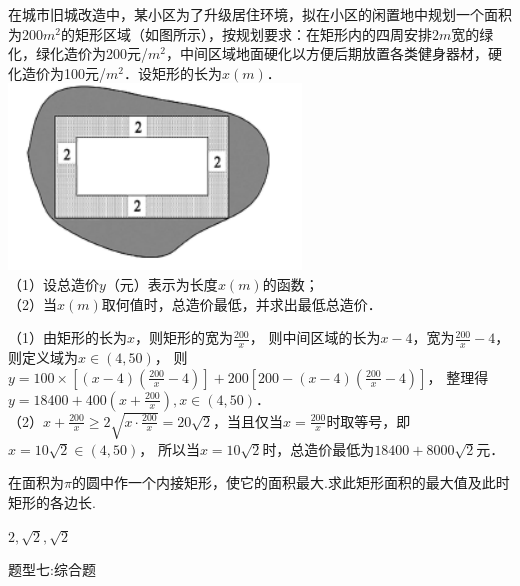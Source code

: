 \par
\begin{problem}
    在城市旧城改造中，某小区为了升级居住环境，拟在小区的闲置地中规划一个面积为$200m^2$的矩形区域（如图所示），按规划要求：在矩形内的四周安排$2m$宽的绿化，绿化造价为200元/$m^2$，中间区域地面硬化以方便后期放置各类健身器材，硬化造价为100元/$m^2$．设矩形的长为$x(m)$．\\
    \includegraphics[scale=1.0]{pictures/image1.png}\\
    （1）设总造价$y$（元）表示为长度$x(m)$的函数；\\
    （2）当$x(m)$取何值时，总造价最低，并求出最低总造价．\\
    \begin{jiexi}
        （1）由矩形的长为$x$，则矩形的宽为$\displaystyle \frac{200}{x}$，
则中间区域的长为$x-4$，宽为$\displaystyle \frac{200}{x}-4$，则定义域为$x\in(4,50)$，
则$\displaystyle y=100\times[(x-4)(\frac{200}{x}-4)]+200[200-(x-4)(\frac{200}{x}-4)]$，
整理得$\displaystyle y=18400+400(x+\frac{200}{x}),x\in(4,50)$．\\
（2）$\displaystyle x+\frac{200}{x}\ge 2\sqrt{x\cdot\frac{200}{x}}=20\sqrt{2}$，当且仅当$\displaystyle x=\frac{200}{x}$时取等号，即$x=10\sqrt{2}\in (4,50)$，
所以当$x=10\sqrt{2}$时，总造价最低为$18400+8000\sqrt{2}$元．
    \end{jiexi}
\end{problem}



\par
\begin{problem}
    在面积为$\pi$的圆中作一个内接矩形，使它的面积最大.求此矩形面积的最大值及此时矩形的各边长.
    \begin{jiexi}
        $2,\sqrt{2},\sqrt{2}$
    \end{jiexi}
\end{problem}


\begin{tcolorbox} 
    \centering
题型七:综合题
\end{tcolorbox}

